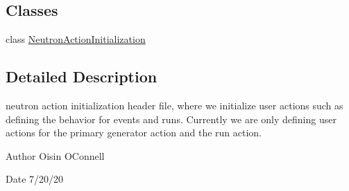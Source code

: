 \subsection*{Classes}
\begin{DoxyCompactItemize}
\item 
class \hyperlink{classNeutronActionInitialization}{Neutron\+Action\+Initialization}
\end{DoxyCompactItemize}


\subsection{Detailed Description}
neutron action initialization header file, where we initialize user actions such as defining the behavior for events and runs. Currently we are only defining user actions for the primary generator action and the run action. 

\begin{DoxyAuthor}{Author}
Oisin O\textquotesingle{}Connell
\end{DoxyAuthor}
\begin{DoxyDate}{Date}
7/20/20 
\end{DoxyDate}
